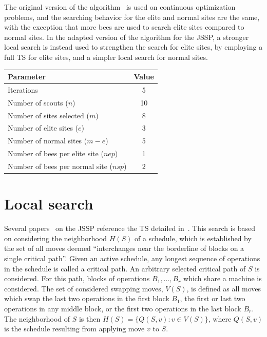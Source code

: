 \documentclass[paper=a4, fontsize=9pt]{scrartcl}
\begin{document}
\begin{multicols}{2}
The original version of the algorithm~\cite{pham2011bees} is used on continuous optimization problems, and the searching behavior for the elite and normal sites are the same, with the exception that more bees are used to search elite sites compared to normal sites. In the adapted version of the algorithm for the \ac{JSSP}, a stronger local search is instead used to strengthen the search for elite sites, by employing a full \ac{TS} for elite sites, and a simpler local search for normal sites.

{
\vspace{0.2cm}
\begin{minipage}{\linewidth{}}
\centering
\begin{tabular}{lc}
\toprule
Parameter                              & Value \\
\midrule
Iterations                             &  5 \\
Number of scouts ($n$)                 & 10 \\
Number of sites selected ($m$)         &  8 \\
Number of elite sites ($e$)            &  3 \\
Number of normal sites ($m-e$)         &  5 \\
Number of bees per elite site ($nep$)  &  1 \\
Number of bees per normal site ($nsp$) &  2 \\
\bottomrule
\end{tabular}
\vspace{-0.2cm}
\label{table:baparams}
\end{minipage}
}

\section*{Local search}

Several papers~\cite{sha2006hybrid}\cite{blum2004ant} on the \ac{JSSP} reference the \acf{TS} detailed in~\cite{nowicki1996fast}. This search is based on considering the neighborhood $H(S)$ of a schedule, which is established by the set of all moves deemed ``interchanges near the borderline of blocks on a single critical path''. Given an active schedule, any longest sequence of operations in the schedule is called a critical path. An arbitrary selected critical path of $S$ is considered. For this path, blocks of operations $B_1, \ldots, B_r$ which share a machine is considered. The set of considered swapping moves, $V(S)$, is defined as all moves which swap the last two operations in the first block $B_1$, the first or last two operations in any middle block, or the first two operations in the last block $B_r$. The neighborhood of $S$ is then $H(S) = \{ Q(S, v) : v \in V(S)\}$, where $Q(S, v)$ is the schedule resulting from applying move $v$ to $S$.


\end{multicols}
\end{document}
